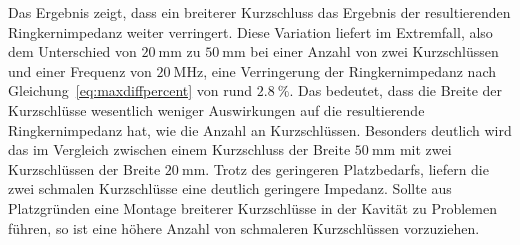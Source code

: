 \par
Das Ergebnis zeigt, dass ein breiterer Kurzschluss das Ergebnis der resultierenden Ringkernimpedanz weiter verringert. Diese Variation liefert im Extremfall, also dem Unterschied von $\SI{20}{\milli\meter}$ zu $\SI{50}{\milli\meter}$ bei einer Anzahl von zwei Kurzschl\"ussen und einer Frequenz von $\SI{20}{\mega\hertz}$, eine Verringerung der Ringkernimpedanz nach Gleichung~\ref{eq:maxdiffpercent} von rund $\SI{2,8}{\%}$. Das bedeutet, dass die Breite der Kurzschl\"usse wesentlich weniger Auswirkungen auf die resultierende Ringkernimpedanz hat, wie die Anzahl an Kurzschl\"ussen. Besonders deutlich wird das im Vergleich zwischen einem Kurzschluss der Breite $\SI{50}{\milli\meter}$ mit zwei Kurzschl\"ussen der Breite $\SI{20}{\milli\meter}$. Trotz des geringeren Platzbedarfs, liefern die zwei schmalen Kurzschl\"usse eine deutlich geringere Impedanz.  Sollte aus Platzgr\"unden eine Montage breiterer Kurzschl\"usse in der Kavit\"at zu Problemen f\"uhren, so ist eine h\"ohere Anzahl von schmaleren Kurzschl\"ussen vorzuziehen. 


